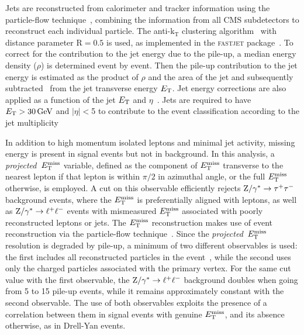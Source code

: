 \documentclass[12pt,twoside,a4paper,cmspaper,final,collab]{cms-tdr}
\begin{document}
Jets are reconstructed from calorimeter and tracker information using
the particle-flow technique~\cite{PFT-09-001,jetpas}, combining the information from
all CMS subdetectors to reconstruct each individual particle. The anti-$\mathrm{k_T}$
clustering algorithm~\cite{antikt} with distance parameter $\mathrm{
R}=0.5$ is used, as implemented in the \textsc{fastjet}
package~\cite{Cacciari:fastjet1,Cacciari:fastjet2}.
To correct for the contribution to the jet energy
due to the pile-up, a median energy density ($\rho$) is determined event by event.
Then the pile-up contribution to the jet energy is estimated as the product of $\rho$ and the area of the
jet and subsequently subtracted~\cite{Cacciari:subtraction} from the jet transverse energy $E_{\mathrm{T}}$.
Jet energy corrections are also applied as a function of the jet $E_{\mathrm{T}}$ and $\eta$~\cite{cmsJEC}.
Jets are required to have $E_{\mathrm{T}}>30\,\text{Ge\hspace{-.08em}V}$ and $|\eta|<$5
to contribute to the event classification according to the jet multiplicity

In addition to high momentum isolated leptons and minimal jet activity, missing
energy is present in signal events but not in background.
In this analysis, a \textit{projected}~$E_{\mathrm{T}}^{\text{miss}}$ variable, defined
as the component of $E_{\mathrm{T}}^{\text{miss}}$ transverse to the nearest lepton if that lepton is within
$\pi/2$ in azimuthal angle, or the full $E_{\mathrm{T}}^{\text{miss}}$ otherwise, is employed.
A cut on this observable efficiently rejects $\mathrm{Z}/\gamma^* \to\tau^+\tau^-$ background events, where the $E_{\mathrm{T}}^{\text{miss}}$
is preferentially aligned with leptons, as well as $\mathrm{Z}/\gamma^*\to \ell^+\ell^-$ events with mismeasured
$E_{\mathrm{T}}^{\text{miss}}$ associated with poorly reconstructed leptons or jets.
The $E_{\mathrm{T}}^{\text{miss}}$ reconstruction makes use of event reconstruction via the particle-flow technique~\cite{PFT-09-001}.
Since the \textit{projected}~$E_{\mathrm{T}}^{\text{miss}}$ resolution is degraded by pile-up,
a minimum of two different observables is used: the first includes all reconstructed particles in the
event~\cite{PFT-09-001}, while the second uses only the charged
particles associated with the primary vertex. For the same
cut value with the first observable, the $\mathrm{Z}/\gamma^*\to \ell^+\ell^-$ background doubles
when going from 5 to 15 pile-up events, while it remains approximately constant with
the second observable. The use of both observables exploits
the presence of a correlation between them in signal events with genuine
$E_{\mathrm{T}}^{\text{miss}}$, and its absence otherwise, as in Drell-Yan events.
\end{document}
